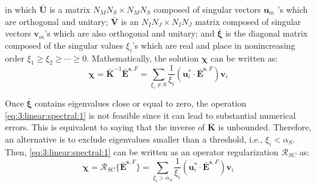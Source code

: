 			\noindent in which $\mathbf{\bar{U}}$ is a matrix $N_MN_S\times N_MN_S$ composed of singular vectors $\mathbf{u}_m$ 's which are orthogonal and unitary; $\mathbf{\bar{V}}$ is an $N_IN_J\times N_IN_J$ matrix composed of singular vectors $\mathbf{v}_m$'s which are also orthogonal and unitary; and $\boldsymbol{\bar{\xi}}$ is the diagonal matrix composed of the singular values $\xi_i$'s which are real and place in nonincreasing order  $\xi_1\ge\xi_2\ge\cdots\ge0$. Mathematically, the solution $\boldsymbol{\chi}$ can be written as:
			\begin{equation}
				\boldsymbol{\chi} = \mathbf{\bar{K}}^{-1}\mathbf{\bar{E}}^{\mathbf{s},F} = \sum\limits_{\xi_i\neq0} \frac{1}{\xi_i} \left(\mathbf{u}^*_i\cdot\mathbf{\bar{E}}^{\mathbf{s},F}\right)\mathbf{v}_i \label{eq:3:linear:spectral:1}
			\end{equation}
			
			Once $\boldsymbol{\bar{\xi}}$ contains eigenvalues close or equal to zero, the operation \eqref{eq:3:linear:spectral:1} is not feasible since it can lead to substantial numerical errors. This is equivalent to saying that the inverse of $\mathbf{\bar{K}}$ is unbounded. Therefore, an alternative is to exclude eigenvalues smaller than a threshold, i.e., $\xi_i<\alpha_{S}$. Then, \eqref{eq:3:linear:spectral:1} can be written as an operator regularization $\mathcal{R}_{SC}$ as:
			\begin{equation}
					\boldsymbol{\chi} = \mathcal{R}_{SC}\{\mathbf{\bar{E}}^{\mathbf{s},F}\} = \sum\limits_{\xi_i>\alpha_{S}} \frac{1}{\xi_i} \left(\mathbf{u}^*_i\cdot\mathbf{\bar{E}}^{\mathbf{s},F}\right)\mathbf{v}_i \label{eq:3:linear:spectral:2}
			\end{equation}
		
